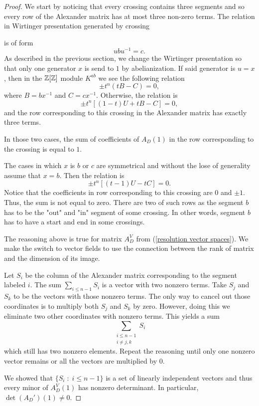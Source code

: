 \begin{proof}
  We start by noticing that every crossing contains three segments and so every row of the Alexander matrix has at most three non-zero terms. The relation in Wirtinger presentation generated by crossing 
  \begin{center}
  \end{center}
  is of form
  $$ubu^{-1}=c.$$
  As described in the previous section, we change the Wirtinger presentation so that only one generator $x$ is send to $1$ by abelianization. If said generator is $u=x$, then in the $\operatorname{\mathbb{Z}}[\operatorname{\mathbb{Z}}]$ module $K^{ab}$ we see the following relation 
  $$\pm t^n(tB-C)=0,$$
  where $B=bx^{-1}$ and $C=cx^{-1}$. Otherwise, the relation is
  $$\pm t^n[(1-t)U+tB-C]=0,$$
  and the row corresponding to this crossing in the Alexander matrix has exactly three terms.

  In those two cases, the sum of coefficients of $A_D(1)$ in the row corresponding to the crossing is equal to $1$.

  The cases in which $x$ is $b$ or $c$ are symmetrical and without the lose of generality assume that $x=b$. Then the relation is 
  $$\pm t^n[(t-1)U-tC]=0.$$
  Notice that the coefficients in row corresponding to this crossing are $0$ and $\pm1$. Thus, the sum is not equal to zero. There are two of such rows as the segment $b$ has to be the "out" and "in" segment of some crossing. In other words, segment $b$ has to have a start and end in some crossings.

  The reasoning above is true for matrix $A_D^V$ from (\ref{resolution vector spaces}). We make the switch to vector fields to use the connection between the rank of matrix and the dimension of its image.

  Let $S_i$ be the column of the Alexander matrix corresponding to the segment labeled $i$. The sum $\sum_{i\leq n-1} S_i$ is a vector with two nonzero terms. Take $S_j$ and $S_k$ to be the vectors with those nonzero terms. The only way to cancel out those coordinates is to multiply both $S_j$ and $S_k$ by zero. However, doing this we eliminate two other coordinates with nonzero terms. This yields a sum
  $$\sum_{\substack{i\leq n-1 \\ i\neq j,k}}S_i$$ 
  which still has two nonzero elements. Repeat the reasoning until only one nonzero vector remains or all the vectors are multiplied by $0$.

  We showed that $\{S_i\;:\;i\leq n-1\}$ is a set of linearly independent vectors and thus every minor of $A_D^V(1)$ has nonzero determinant. In particular, $\det(A_D')(1)\neq 0$.
\end{proof}

